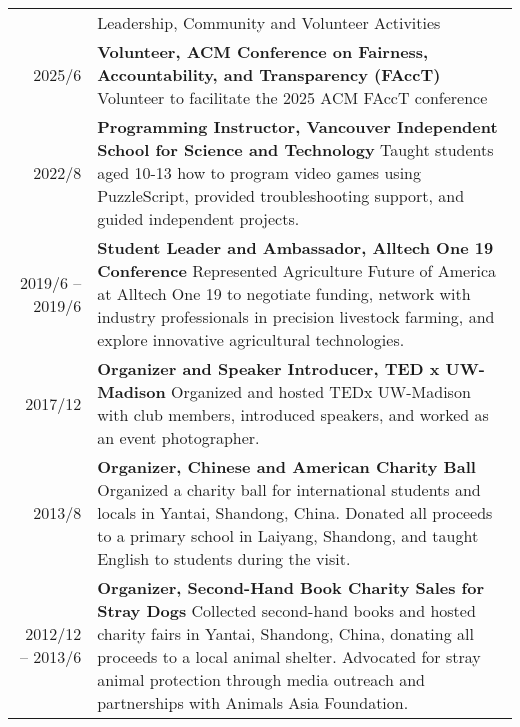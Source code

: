 \documentclass[letterpaper, 11pt]{article}
\newcommand{\headingfont}{\Large\color{OliveGreen}}
\newenvironment{SectionTable}[1]{
	\renewcommand*{\arraystretch}{1.7}
	\setlength{\tabcolsep}{10pt}
	\begin{longtable}{Rp{5.2in}} & #1 \\}
{\end{longtable}\vspace{-.3cm}}
\begin{document}
\begin{SectionTable}{\headingfont Leadership, Community and Volunteer Activities}
2025/6 &
\textbf{Volunteer, ACM Conference on Fairness, Accountability, and Transparency (FAccT)} \newline
Volunteer to facilitate the 2025 ACM FAccT conference  \\
2022/8 &
\textbf{Programming Instructor, Vancouver Independent School for Science and Technology} \newline
Taught students aged 10-13 how to program video games using PuzzleScript, provided troubleshooting support, and guided independent projects. \\
2019/6 -- 2019/6 &
\textbf{Student Leader and Ambassador, Alltech One 19 Conference} \newline
Represented Agriculture Future of America at Alltech One 19 to negotiate funding, network with industry professionals in precision livestock farming, and explore innovative agricultural technologies. \\
2017/12 &
\textbf{Organizer and Speaker Introducer, TED x UW-Madison} \newline
Organized and hosted TEDx UW-Madison with club members, introduced speakers, and worked as an event photographer. \\
2013/8 &
\textbf{Organizer, Chinese and American Charity Ball} \newline
Organized a charity ball for international students and locals in Yantai, Shandong, China. Donated all proceeds to a primary school in Laiyang, Shandong, and taught English to students during the visit. \\
2012/12 -- 2013/6 &
\textbf{Organizer, Second-Hand Book Charity Sales for Stray Dogs} \newline
Collected second-hand books and hosted charity fairs in Yantai, Shandong, China, donating all proceeds to a local animal shelter. Advocated for stray animal protection through media outreach and partnerships with Animals Asia Foundation. \\
\end{SectionTable}
\end{document}
